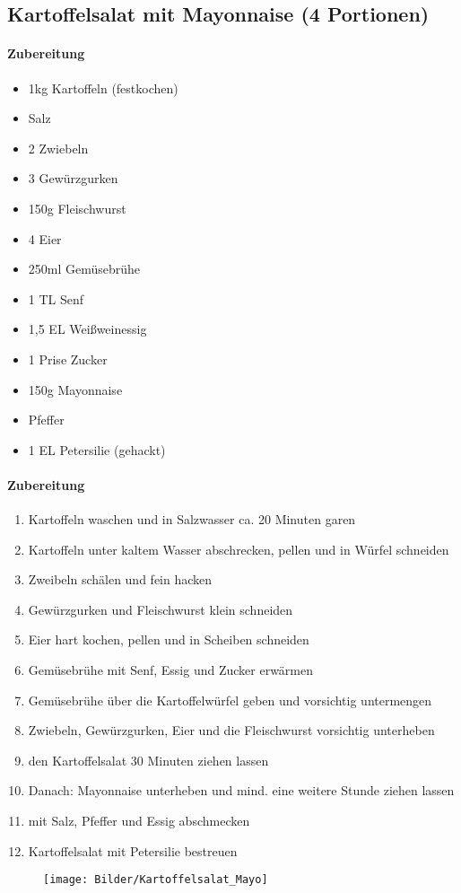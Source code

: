 \newpage
\subsection{Kartoffelsalat mit Mayonnaise (4 Portionen)}
\paragraph{Zubereitung}
\begin{itemize}[noitemsep]
	\item 1kg Kartoffeln (festkochen)
	\item Salz
	\item 2 Zwiebeln
	\item 3 Gewürzgurken
	\item 150g Fleischwurst
	\item 4 Eier
	\item 250ml Gemüsebrühe
	\item 1 TL Senf
	\item 1,5 EL Weißweinessig
	\item 1 Prise Zucker
	\item 150g Mayonnaise
	\item Pfeffer
	\item 1 EL Petersilie (gehackt)
\end{itemize}
\paragraph{Zubereitung}
\begin{enumerate}[noitemsep]
	\item Kartoffeln waschen und in Salzwasser ca. 20 Minuten garen
	\item Kartoffeln unter kaltem Wasser abschrecken, pellen und in Würfel schneiden
	\item Zweibeln schälen und fein hacken
	\item Gewürzgurken und Fleischwurst klein schneiden
	\item Eier hart kochen, pellen und in Scheiben schneiden
	\item Gemüsebrühe mit Senf, Essig und Zucker erwärmen
	\item Gemüsebrühe über die Kartoffelwürfel geben und vorsichtig untermengen
	\item Zwiebeln, Gewürzgurken, Eier und die Fleischwurst vorsichtig unterheben
	\item den Kartoffelsalat 30 Minuten ziehen lassen
	\item Danach: Mayonnaise unterheben und mind. eine weitere Stunde ziehen lassen
	\item mit Salz, Pfeffer und Essig abschmecken
	\item Kartoffelsalat mit Petersilie bestreuen
\end{enumerate}
\begin{figure}[h]
\centering
\texttt{[image: Bilder/Kartoffelsalat\_Mayo]}
\end{figure}